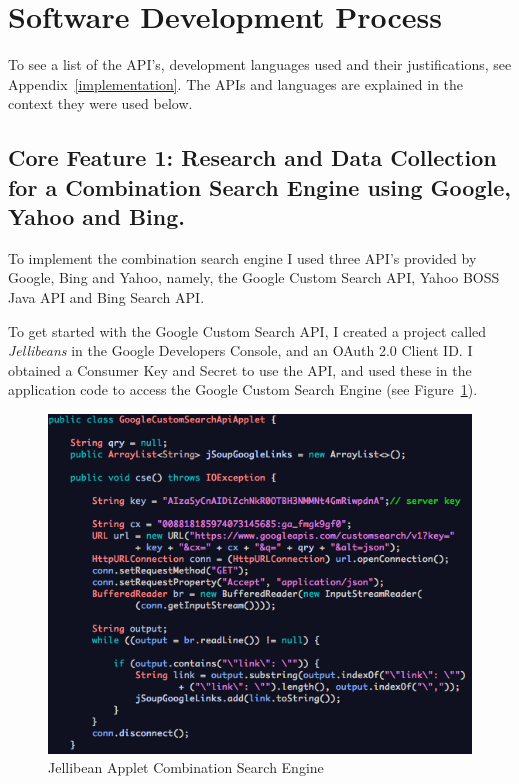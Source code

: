 \documentclass[a4paper, 11pt]{article}
\begin{document}
\section{Software Development Process}

To see a list of the API's, development languages used and their justifications, see Appendix~\ref{implementation}. The APIs and languages are explained in the context they were used below.

\subsection{Core Feature 1: Research and Data Collection for a Combination Search Engine using Google, Yahoo and Bing.} 
To implement the combination search engine I used three API's provided by Google, Bing and Yahoo, namely, the Google Custom Search API, Yahoo BOSS Java API and Bing Search API. 

\vspace{5mm}
To get started with the Google Custom Search API, I created a project called \textit{Jellibeans} in the Google Developers Console, and an OAuth 2.0 Client ID. I obtained a Consumer Key and Secret to use the API, and used these in the application code to access the Google Custom Search Engine (see Figure~\ref{JBeanAppletGoogleCustomSearch1}). 

\begin{figure}[H]
\begin{center}
\includegraphics[scale=0.7]{JBeanAppletGoogleCustomSearch}
\end{center}

\caption{Jellibean Applet Combination Search Engine}
\label{JBeanAppletGoogleCustomSearch1}
\end{figure}
\end{document}
